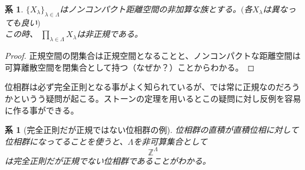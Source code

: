 \documentclass{jsarticle}
\newtheorem{corollary}[theorem]{系}
\begin{document}
\begin{corollary}$\{X_{\lambda}\}_{\lambda\in \Lambda}$はノンコンパクト距離空間の非加算な族とする。$($各$X_{\lambda}$は異なっても良い$)$\\ 
この時、
$\displaystyle{\prod_{\lambda\in \Lambda}X_{\lambda}}$は非正規である。
\end{corollary}
\begin{proof}正規空間の閉集合は正規空間となることと、ノンコンパクトな距離空間は可算離散空間を閉集合として持つ（なぜか？）ことからわかる。
\end{proof}
位相群は必ず完全正則となる事がよく知られているが、では常に正規なのだろうかというう疑問が起こる。ストーンの定理を用いるとこの疑問に対し反例を容易に作る事ができる。
\begin{corollary}[完全正則だが正規ではない位相群の例]位相群の直積が直積位相に対して位相群になってることを使うと、$\Lambda$を非可算集合として
\[
\mathbb{Z}^{\Lambda}
\]は完全正則だが正規でない位相群であることがわかる。

\end{corollary}
\end{document}
